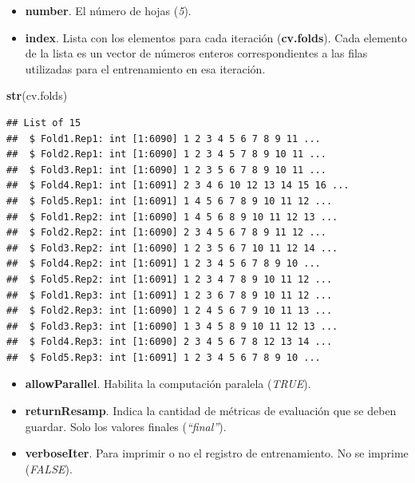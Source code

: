 \documentclass[
]{article}
\newenvironment{Shaded}{\begin{snugshade}}{\end{snugshade}}
\newcommand{\KeywordTok}[1]{\textcolor[rgb]{0.13,0.29,0.53}{\textbf{#1}}}
\newcommand{\NormalTok}[1]{#1}
\providecommand{\tightlist}{%
  \setlength{\itemsep}{0pt}\setlength{\parskip}{0pt}}
\begin{document}
\begin{itemize}
\tightlist
\item
  \textbf{number}. El número de hojas (\emph{5}).
\item
  \textbf{index}. Lista con los elementos para cada iteración
  (\textbf{cv.folds}). Cada elemento de la lista es un vector de números
  enteros correspondientes a las filas utilizadas para el entrenamiento
  en esa iteración.
\end{itemize}

\begin{Shaded}
\begin{Highlighting}[]
\KeywordTok{str}\NormalTok{(cv.folds)}
\end{Highlighting}
\end{Shaded}

\begin{verbatim}
## List of 15
##  $ Fold1.Rep1: int [1:6090] 1 2 3 4 5 6 7 8 9 11 ...
##  $ Fold2.Rep1: int [1:6090] 1 2 3 4 5 7 8 9 10 11 ...
##  $ Fold3.Rep1: int [1:6090] 1 2 3 5 6 7 8 9 10 11 ...
##  $ Fold4.Rep1: int [1:6091] 2 3 4 6 10 12 13 14 15 16 ...
##  $ Fold5.Rep1: int [1:6091] 1 4 5 6 7 8 9 10 11 12 ...
##  $ Fold1.Rep2: int [1:6090] 1 4 5 6 8 9 10 11 12 13 ...
##  $ Fold2.Rep2: int [1:6090] 2 3 4 5 6 7 8 9 11 12 ...
##  $ Fold3.Rep2: int [1:6090] 1 2 3 5 6 7 10 11 12 14 ...
##  $ Fold4.Rep2: int [1:6091] 1 2 3 4 5 6 7 8 9 10 ...
##  $ Fold5.Rep2: int [1:6091] 1 2 3 4 7 8 9 10 11 12 ...
##  $ Fold1.Rep3: int [1:6091] 1 2 3 6 7 8 9 10 11 12 ...
##  $ Fold2.Rep3: int [1:6090] 1 2 4 5 6 7 9 10 11 13 ...
##  $ Fold3.Rep3: int [1:6090] 1 3 4 5 8 9 10 11 12 13 ...
##  $ Fold4.Rep3: int [1:6090] 2 3 4 5 6 7 8 12 13 14 ...
##  $ Fold5.Rep3: int [1:6091] 1 2 3 4 5 6 7 8 9 10 ...
\end{verbatim}

\begin{itemize}
\tightlist
\item
  \textbf{allowParallel}. Habilita la computación paralela
  (\emph{TRUE}).
\item
  \textbf{returnResamp}. Indica la cantidad de métricas de evaluación
  que se deben guardar. Solo los valores finales (\emph{``final''}).
\item
  \textbf{verboseIter}. Para imprimir o no el registro de entrenamiento.
  No se imprime (\emph{FALSE}).
\end{itemize}
\end{document}

